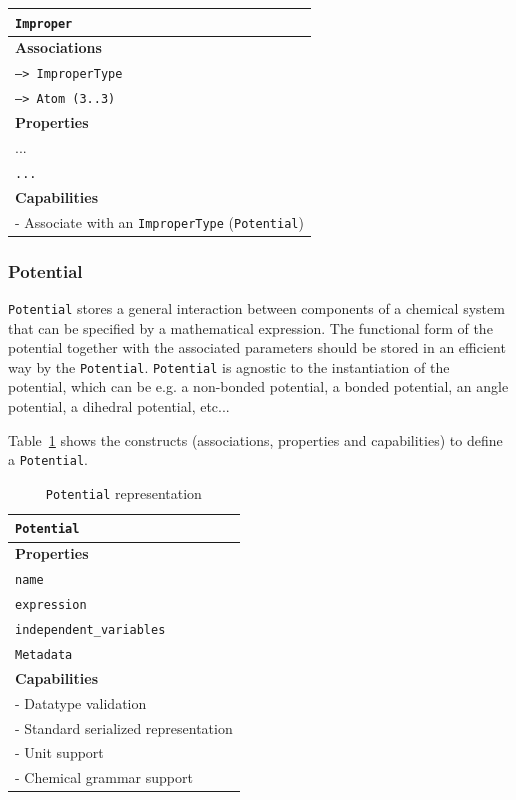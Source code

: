 \documentclass[12pt]{article}
\begin{document}
\begin{table}[ht]
\begin{subtable}[h]{0.45\textwidth}
\begin{tabular}{|l|}
         \hline
         \rowcolor{gray!50}
         \texttt{Improper}  \\
         \hline
         \textbf{Associations} \\
         \hline
         \texttt{--> ImproperType}\\
         \texttt{--> Atom (3..3)}\\
         \textbf{Properties}\\
         \hline
            ...\\
             \texttt{...}\\
         \hline
         \textbf{Capabilities}\\
         \hline
         - Associate with an \texttt{ImproperType} (\texttt{Potential})\\
        \hline
    \end{tabular}
    \end{subtable}

\end{table}

\pagebreak

\subsubsection{Potential}
\texttt{Potential} stores a general interaction between components of a chemical system that can be specified by a mathematical expression. The functional form of the potential together with the associated parameters should be stored in an efficient way by the \texttt{Potential}. \texttt{Potential} is agnostic to the instantiation of the potential, which can be e.g. a non-bonded potential, a bonded potential, an angle potential, a dihedral potential, etc...

Table~\ref{tab:PotSpec} shows  the constructs (associations, properties and capabilities) to define a \texttt{Potential}.

\begin{table}[ht]
    \centering
     \caption{\texttt{Potential} representation}
    \begin{tabular}{|l|}
         \hline
         \rowcolor{gray!50}
         \texttt{Potential}  \\
         \hline
         \textbf{Properties}\\
         \hline
         \texttt{name} \\
         \texttt{expression} \\
         \texttt{independent\_variables}\\
         \texttt{Metadata}\\
         \hline
         \textbf{Capabilities}\\
         \hline
         - Datatype validation \\
         - Standard serialized representation \\
         - Unit support \\
         - Chemical grammar support \\
        \hline
    \end{tabular}
    \label{tab:PotSpec}
\end{table}
\end{document}
